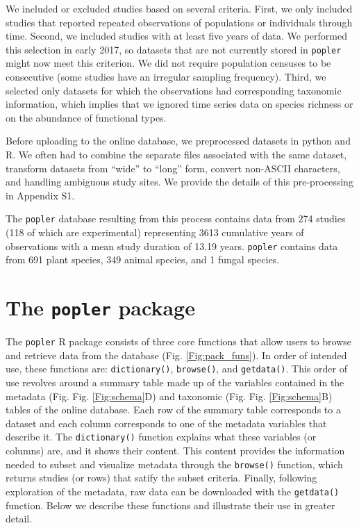 \documentclass{article}\usepackage[]{graphicx}\usepackage[]{color}
\begin{document}
We included or excluded studies based on several criteria. First, we only included studies that reported repeated observations of populations or individuals through time. Second, we included studies with at least five years of data. We performed this selection in early 2017, so datasets that are not currently stored in \texttt{popler} might now meet this criterion. We did not require population censuses to be consecutive (some studies have an irregular sampling frequency). Third, we selected only datasets for which the observations had corresponding taxonomic information, which implies that we ignored time series data on species richness or on the abundance of functional types.

Before uploading to the online database, we preprocessed datasets in python and R. We often had to combine the separate files associated with the same dataset, transform datasets from ``wide'' to ``long'' form, convert non-ASCII characters, and handling ambiguous study sites. We provide the details of this pre-processing in Appendix S1.


The \texttt{popler} database resulting from this process contains data from 274 studies (118 of which are experimental) representing 3613 cumulative years of observations with a mean study duration of 13.19 years. \texttt{popler} contains data from 691 plant species, 349 animal species, and 1 fungal species.

\section*{The \texttt{popler} package}
The \texttt{popler} R package consists of three core functions that allow users to browse and retrieve data from the database (Fig. \ref{Fig:pack_funs}). In order of intended use, these functions are: \texttt{dictionary()}, \texttt{browse()}, and \texttt{get\textunderscore data()}. This order of use revolves around a summary table made up of the variables contained in the metadata (Fig. Fig. \ref{Fig:schema}D) and taxonomic (Fig. Fig. \ref{Fig:schema}B) tables of the online database. Each row of the summary table corresponds to a dataset and each column corresponds to one of the metadata variables that describe it. The \texttt{dictionary()} function explains what these variables (or columns) are, and it shows their content. This content provides the information needed to subset and visualize metadata through the \texttt{browse()} function, which returns studies (or rows) that satify the subset criteria. Finally, following exploration of the metadata, raw data can be downloaded with the \texttt{get\textunderscore data()} function. Below we describe these functions and illustrate their use in greater detail.
\end{document}
